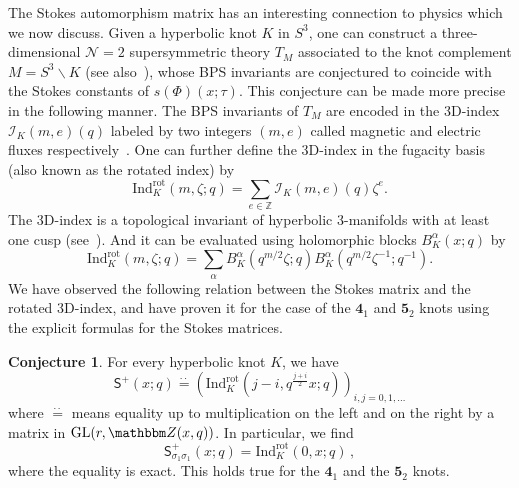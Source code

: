 \documentclass[12pt,reqno]{amsart}
\theoremstyle{definition}
\newtheorem{conjecture}[theorem]{Conjecture}
\def\BZ{\mathbbm Z}
\def\IZ{\mathbb{Z}}
\def\s{\sigma}
\def\GL{\mathrm{GL}}
\def\mc{\mathcal}
\def\md{\mathbf}
\def\ms{\mathsf}
\def\IZ{\mathbb{Z}}
\newcommand{\knot}[1]{\md{#1}}
\begin{document}
The Stokes automorphism matrix has an interesting
connection to physics which we now discuss.  Given a hyperbolic knot
$K$ in $S^3$, one can construct a three-dimensional $\mc{N}=2$
supersymmetric theory $T_M$ associated to the knot complement
$M = S^3\backslash K$ \cite{DGG1} (see also~\cite{ter-yama}), whose
BPS invariants are conjectured to coincide with the Stokes constants
of $s(\Phi)(x;\tau)$.  This conjecture can be made more precise in the
following manner. The BPS invariants of $T_M$ are encoded in the
3D-index $\mc{I}_{K}(m,e)(q)$ labeled by two integers $(m,e)$ called
magnetic and electric fluxes respectively~\cite{DGG1}. One can further
define the 3D-index in the fugacity basis (also known as the rotated
index) by~\cite{DGG2}
\begin{equation}
  \text{Ind}^{\text{rot}}_{K}(m,\zeta;q) =
  \sum_{e\in\IZ}\mc{I}_{K}(m,e)(q)\zeta^e.
\end{equation}
The 3D-index is a topological invariant of hyperbolic 3-manifolds with
at least one cusp (see~\cite{GHRS}).  And it can be evaluated using
holomorphic blocks $B_{K}^\alpha(x;q)$ by \cite{Beem}
\begin{equation}
  \text{Ind}_{K}^{\text{rot}}(m,\zeta;q) = \sum_{\alpha}
  B_K^\alpha(q^{m/2}\zeta;q)B_K^\alpha(q^{m/2}\zeta^{-1};q^{-1}).
  \label{eq:IndB}
\end{equation}
We have observed the following relation between the Stokes
matrix and the rotated 3D-index, and have proven it for the case of
the $\knot{4}_1$ and $\knot{5}_2$ knots using the explicit formulas
for the Stokes matrices.

\begin{conjecture}
  \label{conj.S3D}
  For every hyperbolic knot $K$, we have
  \begin{equation}
    \ms{S}^+(x;q) \stackrel{\cdot\cdot}=
    \left(\text{Ind}^{\text{rot}}_K(j-i,q^{\frac{j+i}{2}}x;q)
    \right)_{i,j=0,1,\ldots}
    \label{eq:SInd}
  \end{equation}
  where $\stackrel{\cdot\cdot}=$ means equality up to multiplication
  on the left and on the right by a matrix in $\GL(r,\BZ(x,q))$.  In
  particular, we find
  \begin{equation}
    \label{S3Dx}
    \ms{S}^+_{\s_1\s_1}(x;q) =
    \text{Ind}^{\text{rot}}_{K}(0,x;q)
    \,,
  \end{equation}
  where the equality is exact.  This holds true for the $\knot{4}_1$
  and the $\knot{5}_2$ knots.
\end{conjecture}
\end{document}
